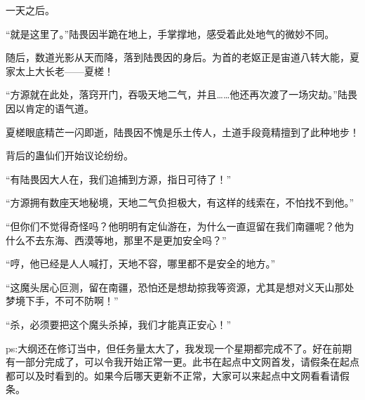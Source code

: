 \begin{this_body}
一天之后。

“就是这里了。”陆畏因半跪在地上，手掌撑地，感受着此处地气的微妙不同。

随后，数道光影从天而降，落到陆畏因的身后。为首的老妪正是宙道八转大能，夏家太上大长老——夏槎！

“方源就在此处，落窍开门，吞吸天地二气，并且……他还再次渡了一场灾劫。”陆畏因以肯定的语气道。

夏槎眼底精芒一闪即逝，陆畏因不愧是乐土传人，土道手段竟精擅到了此种地步！

背后的蛊仙们开始议论纷纷。

“有陆畏因大人在，我们追捕到方源，指日可待了！”

“方源拥有数座天地秘境，天地二气负担极大，有这样的线索在，不怕找不到他。”

“但你们不觉得奇怪吗？他明明有定仙游在，为什么一直逗留在我们南疆呢？他为什么不去东海、西漠等地，那里不是更加安全吗？”

“哼，他已经是人人喊打，天地不容，哪里都不是安全的地方。”

“这魔头居心叵测，留在南疆，恐怕还是想劫掠我等资源，尤其是想对义天山那处梦境下手，不可不防啊！”

“杀，必须要把这个魔头杀掉，我们才能真正安心！”

ps:大纲还在修订当中，但任务量太大了，我发现一个星期都完成不了。好在前期有一部分完成了，可以令我开始正常一更。此书在起点中文网首发，请假条在起点都可以及时看到的。如果今后哪天更新不正常，大家可以来起点中文网看看请假条。

\end{this_body}


